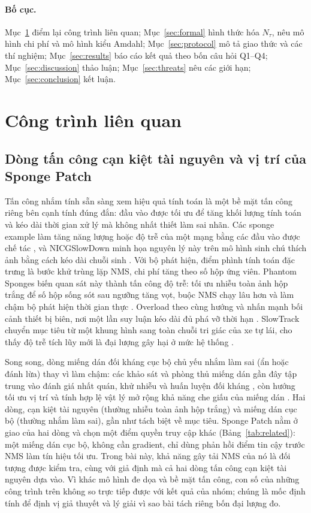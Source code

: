 \documentclass[12pt,a4paper]{article}
\newcommand{\Ntau}{N_{\tau}}
\begin{document}
\paragraph{Bố cục.}
Mục~\ref{sec:related} điểm lại công trình liên quan; Mục~\ref{sec:formal} hình thức hóa $\Ntau$, nêu mô hình chi phí và mô hình kiểu Amdahl; Mục~\ref{sec:protocol} mô tả giao thức và các thí nghiệm; Mục~\ref{sec:results} báo cáo kết quả theo bốn câu hỏi Q1--Q4; Mục~\ref{sec:discussion} thảo luận; Mục~\ref{sec:threats} nêu các giới hạn; Mục~\ref{sec:conclusion} kết luận.

\section{Công trình liên quan}
\label{sec:related}
\subsection{Dòng tấn công cạn kiệt tài nguyên và vị trí của Sponge Patch}
Tấn công nhắm tính sẵn sàng xem hiệu quả tính toán là một bề mặt tấn công riêng bên cạnh tính đúng đắn: đầu vào được tối ưu để tăng khối lượng tính toán và kéo dài thời gian xử lý mà không nhất thiết làm sai nhãn. Các sponge example làm tăng năng lượng hoặc độ trễ của một mạng bằng các đầu vào được chế tác \cite{shumailov2021sponge}, và NICGSlowDown minh họa nguyên lý này trên mô hình sinh chú thích ảnh bằng cách kéo dài chuỗi sinh \cite{nicgslowdown2022}. Với bộ phát hiện, điểm phình tính toán đặc trưng là bước khử trùng lặp NMS, chi phí tăng theo số hộp ứng viên. Phantom Sponges biến quan sát này thành tấn công độ trễ: tối ưu nhiễu toàn ảnh hộp trắng để số hộp sống sót sau ngưỡng tăng vọt, buộc NMS chạy lâu hơn và làm chậm bộ phát hiện thời gian thực \cite{phantom2023}. Overload theo cùng hướng và nhấn mạnh bối cảnh thiết bị biên, nơi một lần suy luận kéo dài đủ phá vỡ thời hạn \cite{overload2024}. SlowTrack chuyển mục tiêu từ một khung hình sang toàn chuỗi tri giác của xe tự lái, cho thấy độ trễ tích lũy mới là đại lượng gây hại ở mức hệ thống \cite{slowtrack2024}.

Song song, dòng miếng dán đối kháng cục bộ chủ yếu nhắm làm sai (ẩn hoặc đánh lừa) thay vì làm chậm: các khảo sát và phòng thủ miếng dán gần đây tập trung vào đánh giá nhất quán, khử nhiễu và huấn luyện đối kháng \cite{apde2025,pbcat2025}, còn hướng tối ưu vị trí và tính hợp lệ vật lý mở rộng khả năng che giấu của miếng dán \cite{iap2025,badpatch2025}. Hai dòng, cạn kiệt tài nguyên (thường nhiễu toàn ảnh hộp trắng) và miếng dán cục bộ (thường nhắm làm sai), gần như tách biệt về mục tiêu. Sponge Patch nằm ở giao của hai dòng và chọn một điểm quyền truy cập khác (Bảng~\ref{tab:related}): một miếng dán cục bộ, không cần gradient, chỉ dùng phản hồi điểm tin cậy trước NMS làm tín hiệu tối ưu. Trong bài này, khả năng gây tải NMS của nó là đối tượng được kiểm tra, cùng với giả định mà cả hai dòng tấn công cạn kiệt tài nguyên dựa vào. Vì khác mô hình đe dọa và bề mặt tấn công, con số của những công trình trên không so trực tiếp được với kết quả của nhóm; chúng là mốc định tính để định vị giả thuyết và lý giải vì sao bài tách riêng bốn đại lượng đo.
\end{document}
